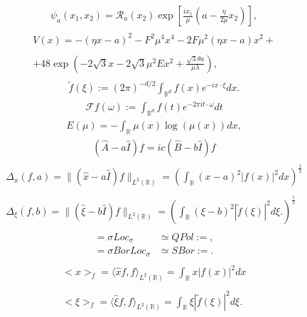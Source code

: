 \begin{align*} \psi_a(x_1,x_2)= \mathcal{R}_a (x_2)\exp \left[ \frac{i x_1}{\mu} \left(a-\frac{\eta}{2 \mu} x_2 \right) \right],\end{align*}
\begin{align*}\begin{array}{c}V(x)=-(\eta x-a)^2-F^2\mu^4x^4-2 F \mu^2 (\eta x-a)x^2+\\\\+48 \exp \left(-2 \sqrt{3} x-2 \sqrt{3} \mu^2Ex^2+ \frac{\sqrt{3} \theta a}{\mu \lambda} \right),\end{array}\end{align*}
\begin{align*}\widetilde{f} (\xi) := (2 \pi )^{- d/2} \int_{\mathbb{R}^d} f(x) e^{- i x \cdot \xi} dx.\end{align*}
\begin{align*}\mathcal{F} f( \omega) := \int_{\mathbb{R}^d} f(t) e^{-2 \pi i t \cdot \omega} dt\end{align*}
\begin{align*}E(\mu)=-\int_{\mathbb{R}} \mu(x) \log \left(\mu(x) \right) dx,\end{align*}
\begin{align*}(\widehat{A} -a \widehat{I}) f = i c (\widehat{B} -b \widehat{I}) f\end{align*}
\begin{align*}\begin{array}{l}\Delta_x (f,a)= \|(\widehat{x} -a \widehat{I}) f \|_{L^2 (\mathbb{R})} = \left(\int_{\mathbb{R}} (x-a)^2 | f (x)|^2 dx \right)^{\frac{1}{2}}\\\\\Delta_{\xi} (f,b)= \|(\widehat{\xi} -b \widehat{I}) f \|_{L^2 (\mathbb{R})} = \left(\int_{\mathbb{R}} (\xi-b)^2 | \widetilde{f} (\xi)|^2 d \xi . \right)^{\frac{1}{2}}\end{array}\end{align*}
\begin{align*}\begin{aligned} = \!{\sigma Loc}_\sigma &\simeq \!{QPol} := , \\ = \!{\sigma BorLoc}_\sigma &\simeq \!{SBor} := .\end{aligned}\end{align*}
\begin{align*}\begin{array}{l}<x>_f= \langle \widehat{x}f, f \rangle_{L^2 (\mathbb{R})}= \int_{\mathbb{R}} x | f (x)|^2 dx \\\\<\xi>_f= \langle \widehat{\xi}f, f \rangle_{L^2 (\mathbb{R})}= \int_{\mathbb{R}} \xi | \widetilde{f} (\xi)|^2 d \xi .\end{array}\end{align*}
